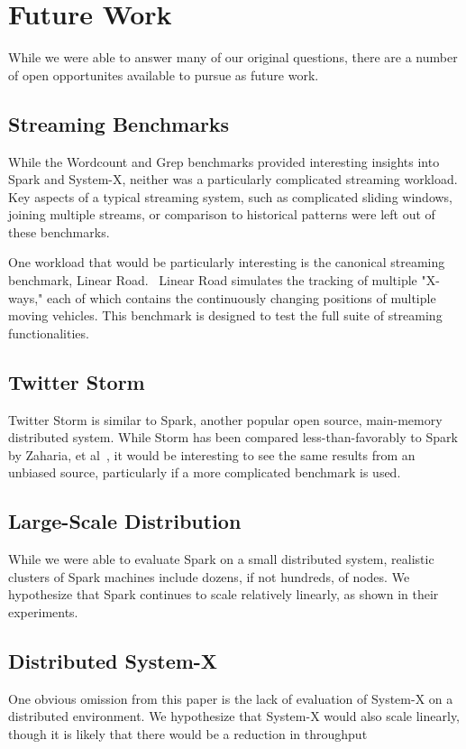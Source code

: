 \section{Future Work}
While we were able to answer many of our original questions, there are a number of open opportunites available to pursue as future work.

\subsection{Streaming Benchmarks}
While the Wordcount and Grep benchmarks provided interesting insights into Spark and System-X, neither was a particularly complicated streaming workload.  Key aspects of a typical streaming system, such as complicated sliding windows, joining multiple streams, or comparison to historical patterns were left out of these benchmarks.

One workload that would be particularly interesting is the canonical streaming benchmark, Linear Road.~\cite{linearroad}  Linear Road simulates the tracking of multiple "X-ways," each of which contains the continuously changing positions of multiple moving vehicles.  This benchmark is designed to test the full suite of streaming functionalities.

\subsection{Twitter Storm}
Twitter Storm is similar to Spark, another popular open source, main-memory distributed system.  While Storm has been compared less-than-favorably to Spark by Zaharia, et al~\cite{dstreams}, it would be interesting to see the same results from an unbiased source, particularly if a more complicated benchmark is used.

\subsection{Large-Scale Distribution}
While we were able to evaluate Spark on a small distributed system, realistic clusters of Spark machines include dozens, if not hundreds, of nodes.  We hypothesize that Spark continues to scale relatively linearly, as shown in their experiments.~\cite{dstreams}

\subsection{Distributed System-X}
One obvious omission from this paper is the lack of evaluation of System-X on a distributed environment.  We hypothesize that System-X would also scale linearly, though it is likely that there would be a reduction in throughput 

